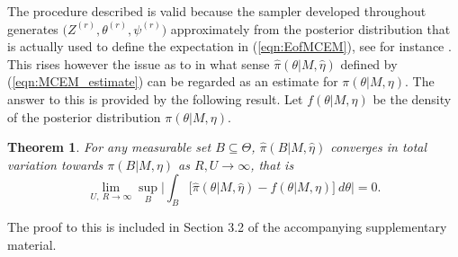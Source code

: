 \documentclass{bioinfo}
\newtheorem{thrm}{Theorem}
\begin{document}
The procedure described is valid because the sampler developed
throughout generates $\big(Z^{(r)}, \theta^{(r)}, \psi^{(r)}\big)$
approximately from the posterior distribution that is actually used to
define the expectation in (\ref{eqn:EofMCEM}), see for instance
\cite{FM}. This rises however the issue as to in what sense
$\widehat\pi(\theta|M, \hat\eta)$ defined by (\ref{eqn:MCEM_estimate})
can be regarded as an estimate for $\pi(\theta|M, \eta)$. The answer
to this is provided by the following result. Let $f(\theta|M, \eta)$
be the density of the posterior distribution $\pi(\theta|M, \eta)$.

\begin{thrm} For any measurable set $B\subseteq \Theta$,
 $\widehat\pi(B|M,\hat\eta)$ converges in total variation
towards $\pi(B|M,\eta)$ as $R, U \to \infty$, that is
\[
   \lim_{U,\ R\to\infty}
   \sup_{B}
    \bigg|
     \int_B
     \Big[
       \widehat \pi(\theta|M, \hat\eta) - f(\theta|M,\eta)
     \Big]\ d\theta
    \bigg|
   = 0.
\]
\end{thrm}

The proof to this is included in Section 3.2 of the accompanying 
supplementary material.
\end{document}
